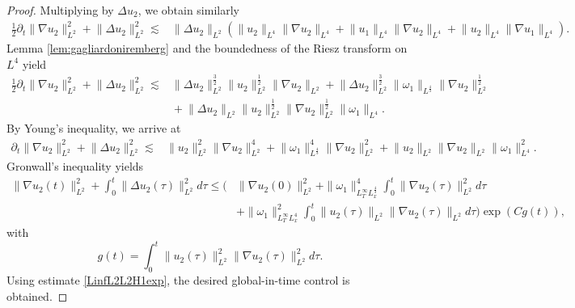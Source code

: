 \documentclass[11pt,a4paper]{article}
\newcommand{\w}{\omega}
\newcommand{\pa}{\partial}
\newcommand{\na}{\nabla}
\newcommand{\norm}[1]{\|#1\|}
\begin{document}
\begin{proof}
Multiplying by $\Delta u_2$, we obtain similarly
$$
\begin{aligned}
\frac{1}{2}\pa_t\norm{\na u_2}^2_{L^2}\!+\!\norm{\Delta u_2}_{L^2}^2\lesssim  &
\norm{\Delta u_2}_{L^2}(\norm{u_2}_{L^4}\norm{\na u_2}_{L^4}\!+\!\norm{u_1}_{L^4}\norm{\na u_2}_{L^4}\!+\!\norm{u_2}_{L^4}\norm{\na u_1}_{L^4}).
\end{aligned}$$
Lemma \ref{lem:gagliardoniremberg} and the boundedness of the Riesz transform on $L^4$ yield
$$
\begin{aligned}
\frac{1}{2}\pa_t\norm{\na u_2}^2_{L^2}\!+\!\norm{\Delta u_2}_{L^2}^2\lesssim  &
\norm{\Delta u_2}_{L^2}^\frac{3}{2}\norm{u_2}^\frac{1}{2}_{L^2}\norm{\na u_2}_{L^2}\!+\!\norm{\Delta u_2}^\frac{3}{2}_{L^2}\norm{\w_1}_{L^\frac{4}{3}}\norm{\na u_2}^\frac{1}{2}_{L^2}\\
&\!+\!\norm{\Delta u_2}_{L^2}\norm{u_2}^\frac{1}{2}_{L^2}\norm{\na u_2}^\frac{1}{2}_{L^2}\norm{\w_1}_{L^4}.
\end{aligned}$$
By Young's inequality, we arrive at
$$
\begin{aligned}
\pa_t\norm{\na u_2}^2_{L^2}\!+\!\norm{\Delta u_2}_{L^2}^2\lesssim  &
\norm{u_2}^2_{L^2}\norm{\na u_2}^4_{L^2}\!+\!\norm{\w_1}^4_{L^\frac{4}{3}}\norm{\na u_2}^2_{L^2}\!+\!\norm{u_2}_{L^2}\norm{\na u_2}_{L^2}\norm{\w_1}^2_{L^4}.
\end{aligned}$$
Gronwall's inequality yields 
$$\begin{aligned}
\norm{\na u_2(t)}^2_{L^2}+\int_0^t\norm{\Delta u_2(\tau)}_{L^2}^2d\tau\leq \Big(&\norm{\na u_2(0)}^2_{L^2}
+\norm{\w_1}^4_{L^\infty_TL_x^\frac{4}{3}}\int_0^t\norm{\na u_2(\tau)}^2_{L^2}d\tau\\
&+\norm{\w_1}^2_{L^\infty_TL^4_x}\int_0^t \norm{u_2(\tau)}_{L^2}\norm{\na u_2(\tau)}_{L^2}d\tau\Big)\exp(Cg(t)),
\end{aligned}$$
with
$$g(t)=\int_0^t \norm{u_2(\tau)}_{L^2}^2\norm{\na u_2(\tau)}_{L^2}^2d\tau.$$
Using estimate \eqref{LinfL2L2H1exp}, the desired global-in-time control is obtained.
\end{proof}
\end{document}
